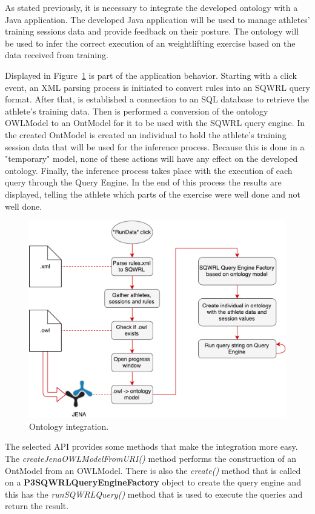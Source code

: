 As stated previously, it is necessary to integrate the developed ontology with a Java application.
The developed Java application will be used to manage athletes' training sessions data and provide feedback on their posture.
The ontology will be used to infer the correct execution of an weightlifting exercise based on the data received from training.

Displayed in Figure~\ref{fig:ont_int} is part of the application behavior.
Starting with a click event, an XML parsing process is initiated to convert rules into an SQWRL query format.
After that, is established a connection to an SQL database to retrieve the athlete's training data.
Then is performed a conversion of the ontology OWLModel to an OntModel for it to be used with the SQWRL query engine.
In the created OntModel is created an individual to hold the athlete's training session data that will be used for the inference process.
Because this is done in a "temporary" model, none of these actions will have any effect on the developed ontology.
Finally, the inference process takes place with the execution of each query through the Query Engine.
In the end of this process the results are displayed, telling the athlete which parts of the exercise were well done and not well done.

\begin{figure}[h]
	\centering
		\includegraphics[width=1.00\textwidth]{Images/integration.pdf}
	\caption{Ontology integration.}
	\label{fig:ont_int}
\end{figure}

The selected API provides some methods that make the integration more easy.
The \textit{createJenaOWLModelFromURI()} method performs the construction of an OntModel from an OWLModel.
There is also the \textit{create()} method that is called on a \textbf{P3SQWRLQueryEngineFactory} object to create the query engine and this has the \textit{runSQWRLQuery()} method that is used to execute the queries and return the result. 
